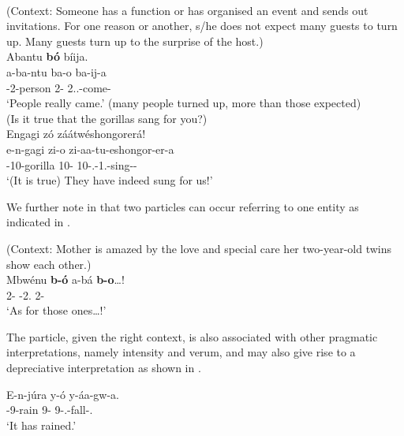 \documentclass[output=paper]{langscibook}
\begin{document}
\ea
\label{bkm:Ref113717125}
\citep[19]{AsiimwevanderWal2021}\\
(Context: Someone has a function or has organised an event and sends out invitations. For one reason or another, s/he does not expect many guests to turn up. Many guests turn up to the surprise of the host.)\\
Abantu \textbf{bó} bíija.\\
\gll
a-ba-ntu  ba-o  ba-ij-a\\
\AUG{}-2-person  2-\CM{}  2\SM{}.\N{}.\PST{}-{}come-\FV{}\\
\glt
`People really came.’ (many people turned up, more than those expected)\\

\ex
\label{bkm:Ref38213858}
(Is it true that the gorillas sang for you?)\\
Engagi zó záátwéshongorerá!\\
\gll
e-n-gagi  zi-o  zi-aa-tu-eshongor-er-a\\
\AUG{}-{}10-gorilla  10-\CM{}  10\SM{}-\N{}.\PST{}-1\PL{}.\OM{}-sing-\APPL{}-\FV{}\\
\glt
`(It is true) They have indeed sung for us!’\\


\z

We further note in \citet{AsiimwevanderWal2021} that two particles can occur referring to one entity as indicated in .

\ea
\label{bkm:Ref113717468}
(Context: Mother is amazed by the love and special care her two-year-old twins show each other.)\\
\gll
Mbwénu  \textbf{b-ó}  a-bá  \textbf{b-o}…!\\
\DM{}  2-\CM{}  \DEM{}-2.\PROX{}  2-\CM{} \\
\glt
`As for those ones…!’ \citep[26]{AsiimwevanderWal2021}\\


\z

The particle, given the right context, is also associated with other pragmatic interpretations, namely intensity and verum, and may also give rise to a depreciative interpretation as shown in .

\ea
\label{bkm:Ref136078566}
\gll
E-n-júra  y-ó  y-áa-gw-a.\\
\AUG{}-{}9-rain  9-\CM{}  9-\N{}.\PST{}-{}fall-\FV{}.{}\\
\glt
‘It has rained.’\\
\end{document}
